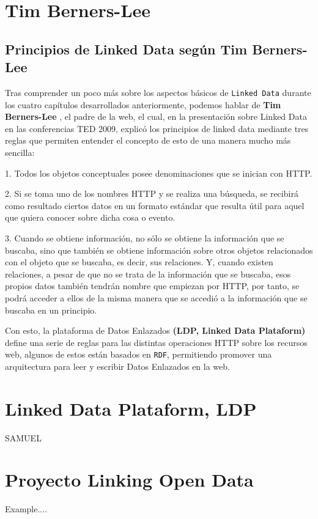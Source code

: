 \documentclass[11pt]{report}
\begin{document}
	\chapter{Tim Berners-Lee}
	
	\section{Principios de Linked Data según Tim Berners-Lee}

	Tras comprender un poco más sobre los aspectos básicos de \texttt{Linked Data} durante los cuatro capítulos desarrollados anteriormente, podemos hablar de \textbf{Tim Berners-Lee } \cite{11}, el padre de la web,  el cual, en la presentación sobre Linked Data en las conferencias TED 2009, explicó los principios de linked data mediante tres reglas que permiten entender el concepto de esto de una manera mucho más sencilla:

	1. Todos los objetos conceptuales posee denominaciones que se inician con HTTP.

	2. Si se toma uno de los nombres HTTP y se realiza una búsqueda, se recibirá como resultado ciertos datos en un formato estándar que resulta útil para aquel que quiera conocer sobre dicha cosa o evento.

	3. Cuando se obtiene información, no sólo se obtiene la información que se buscaba, sino que también se obtiene información sobre otros objetos relacionados con el objeto que se buscaba, es decir, sus relaciones. Y, cuando existen relaciones, a pesar de que no se trata de la información que se buscaba, esos propios datos también tendrán nombre que empiezan por HTTP, por tanto, se podrá acceder a ellos de la misma manera que se accedió a la información que se buscaba en un principio. 

	Con esto, la plataforma de Datos Enlazados \textbf{(LDP, Linked Data Plataform)} define una serie de reglas para las distintas operaciones HTTP sobre los recursos web, algunos de estos están basados en \texttt{RDF}, permitiendo promover una arquitectura para leer y escribir Datos Enlazados en la web.

	\chapter{Linked Data Plataform, LDP}
	SAMUEL

	\chapter{Proyecto Linking Open Data}
	Example....
\end{document}
